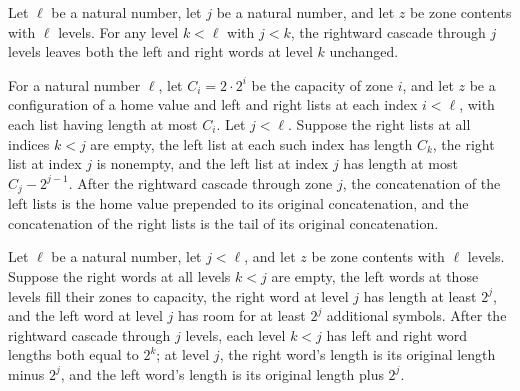 \begin{theorem}
\label{Turing.zoneCascadeRight_frame}
\leanok
{}
Let $\ell$ be a natural number, let $j$ be a natural number, and let $z$ be zone
contents with $\ell$ levels. For any level $k<\ell$ with $j<k$, the rightward cascade
through $j$ levels leaves both the left and right words at level $k$ unchanged.
\end{theorem}

\begin{theorem}
\label{Turing.zoneSide_cascadeRight}
\leanok
{}
For a natural number $\ell$, let $C_i=2\cdot 2^i$ be the capacity of zone $i$, and let
$z$ be a configuration of a home value and left and right lists at each index $i<\ell$,
with each list having length at most $C_i$. Let $j<\ell$. Suppose the right lists at all
indices $k<j$ are empty, the left list at each such index has length $C_k$, the right
list at index $j$ is nonempty, and the left list at index $j$ has length at most
$C_j-2^{j-1}$. After the rightward cascade through zone $j$, the concatenation of the
left lists is the home value prepended to its original concatenation, and the
concatenation of the right lists is the tail of its original concatenation.
\end{theorem}

\begin{theorem}
\label{Turing.zoneCascadeRight_lengths}
\leanok
{}
Let $\ell$ be a natural number, let $j<\ell$, and let $z$ be zone contents with $\ell$
levels. Suppose the right words at all levels $k<j$ are empty, the left words at those
levels fill their zones to capacity, the right word at level $j$ has length at least
$2^j$, and the left word at level $j$ has room for at least $2^j$ additional symbols.
After the rightward cascade through $j$ levels, each level $k<j$ has left and right word
lengths both equal to $2^k$; at level $j$, the right word's length is its original
length minus $2^j$, and the left word's length is its original length plus $2^j$.
\end{theorem}

